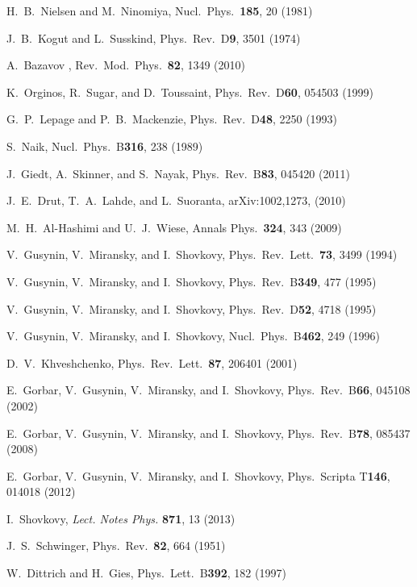 \documentclass[aps,prd,twocolumn,showpacs,superscriptaddress,groupedaddress]{revtex4}  %
\begin{document}
\begin{thebibliography}{99}
H.~B.~Nielsen and M.~Ninomiya, Nucl.\ Phys.\ {\bf 185}, 20 (1981)

J.~B.~Kogut and L.~Susskind, Phys.\ Rev.\ D{\bf 9}, 3501 (1974)

A.~Bazavov \etal, Rev.\ Mod.\ Phys.\ {\bf 82}, 1349 (2010)

K.~Orginos, R.~Sugar, and D.~Toussaint, Phys.\ Rev.\ D{\bf 60}, 054503 (1999)

G.~P.~Lepage and P.~B.~Mackenzie, Phys.\ Rev.\ D{\bf 48}, 2250 (1993)

S.~Naik, Nucl.\ Phys.\ B{\bf 316}, 238 (1989)

J.~Giedt, A.~Skinner, and S.~Nayak, Phys.\ Rev.\ B{\bf 83}, 045420 (2011)

J.~E.~Drut, T.~A.~Lahde, and L.~Suoranta, arXiv:1002,1273, (2010)

M.~H.~Al-Hashimi and U.~J.~Wiese, Annals Phys.\ {\bf 324}, 343 (2009)

V.~Gusynin, V.~Miransky, and I.~Shovkovy, Phys.\ Rev.\ Lett.\ {\bf 73}, 3499 (1994)

V.~Gusynin, V.~Miransky, and I.~Shovkovy, Phys.\ Rev.\ B{\bf 349}, 477 (1995)

V.~Gusynin, V.~Miransky, and I.~Shovkovy, Phys.\ Rev.\ D{\bf 52}, 4718 (1995)

V.~Gusynin, V.~Miransky, and I.~Shovkovy, Nucl.\ Phys.\ B{\bf 462}, 249 (1996)

D.~V.~Khveshchenko, Phys.\ Rev.\ Lett.\ {\bf 87}, 206401 (2001)

E.~Gorbar, V.~Gusynin, V.~Miransky, and I.~Shovkovy, Phys.\ Rev.\ B{\bf 66}, 045108 (2002)

E.~Gorbar, V.~Gusynin, V.~Miransky, and I.~Shovkovy, Phys.\ Rev.\ B{\bf 78}, 085437 (2008)

E.~Gorbar, V.~Gusynin, V.~Miransky, and I.~Shovkovy, Phys.\ Scripta T{\bf146}, 014018 (2012)

I.~Shovkovy, {\it Lect. Notes Phys.} {\bf 871}, 13 (2013)

J.~S.~Schwinger, Phys.\ Rev.\ {\bf 82}, 664 (1951)

W.~Dittrich and H.~Gies, Phys.\ Lett.\ B{\bf 392}, 182 (1997)


\end{thebibliography}
\end{document}
